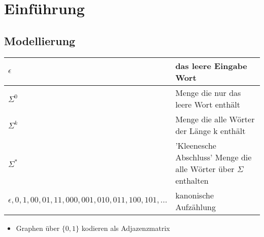 \documentclass[a4paper, 10pt]{article}
\theoremstyle{definition}
\newcommand{\kleene}{\Sigma^*}
\begin{document}
\small
\section{Einführung}
\subsection{Modellierung}
\begin{tabular}{l| l}
    $\epsilon$ & das leere Eingabe Wort\\
    \hline
    $\Sigma^0$ & Menge die nur das leere Wort enthält  \\
    \hline
    $\Sigma^k$ & Menge die alle Wörter der Länge k enthält\\
    \hline
    $\kleene$ & 'Kleenesche Abschluss' Menge die alle Wörter über $\Sigma$ enthalten\\
    \hline
    $\epsilon,0,1,00,01,11,000,001,010,011,100,101,\dots$&kanonische Aufzählung
\end{tabular}
\begin{itemize}
    \item Graphen über $\{0,1\}$ kodieren als Adjazenzmatrix
\end{itemize}
\end{document}
